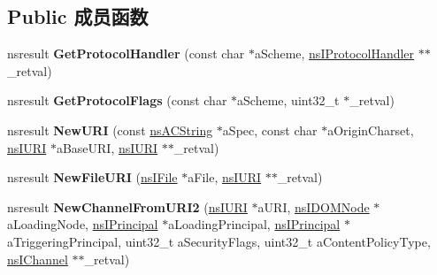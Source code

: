 \subsection*{Public 成员函数}
\begin{DoxyCompactItemize}
\item 
\mbox{\label{interfacens_i_i_o_service_a388e463119438b98e273cabfe7a417ae}} 
nsresult {\bfseries Get\+Protocol\+Handler} (const char $\ast$a\+Scheme, \hyperlink{interfacens_i_protocol_handler}{ns\+I\+Protocol\+Handler} $\ast$$\ast$\+\_\+retval)
\item 
\mbox{\label{interfacens_i_i_o_service_a2435081a0fdbd3e4aa0681b9279ca82d}} 
nsresult {\bfseries Get\+Protocol\+Flags} (const char $\ast$a\+Scheme, uint32\+\_\+t $\ast$\+\_\+retval)
\item 
\mbox{\label{interfacens_i_i_o_service_a13abae6d81c6819cdb983d17739fda46}} 
nsresult {\bfseries New\+U\+RI} (const \hyperlink{structns_c_string_container}{ns\+A\+C\+String} $\ast$a\+Spec, const char $\ast$a\+Origin\+Charset, \hyperlink{interfacens_i_u_r_i}{ns\+I\+U\+RI} $\ast$a\+Base\+U\+RI, \hyperlink{interfacens_i_u_r_i}{ns\+I\+U\+RI} $\ast$$\ast$\+\_\+retval)
\item 
\mbox{\label{interfacens_i_i_o_service_ac051eed8d050e32495ecb8978990bcde}} 
nsresult {\bfseries New\+File\+U\+RI} (\hyperlink{interfacens_i_file}{ns\+I\+File} $\ast$a\+File, \hyperlink{interfacens_i_u_r_i}{ns\+I\+U\+RI} $\ast$$\ast$\+\_\+retval)
\item 
\mbox{\label{interfacens_i_i_o_service_adfa5f8e407c15cdcb3e5b91244d2b2eb}} 
nsresult {\bfseries New\+Channel\+From\+U\+R\+I2} (\hyperlink{interfacens_i_u_r_i}{ns\+I\+U\+RI} $\ast$a\+U\+RI, \hyperlink{interfacens_i_d_o_m_node}{ns\+I\+D\+O\+M\+Node} $\ast$a\+Loading\+Node, \hyperlink{interfacens_i_supports}{ns\+I\+Principal} $\ast$a\+Loading\+Principal, \hyperlink{interfacens_i_supports}{ns\+I\+Principal} $\ast$a\+Triggering\+Principal, uint32\+\_\+t a\+Security\+Flags, uint32\+\_\+t a\+Content\+Policy\+Type, \hyperlink{interfacens_i_channel}{ns\+I\+Channel} $\ast$$\ast$\+\_\+retval)
\item 
\mbox{\label{interfacens_i_i_o_service_a1d2a92e0a847c67e3afd9604f89ed0a7}} 

\end{DoxyCompactItemize}

